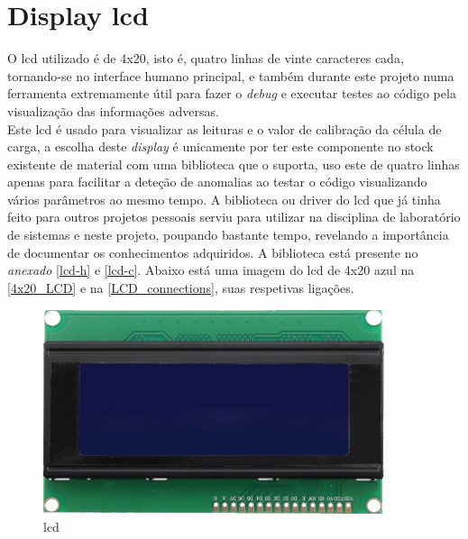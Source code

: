 \section{Display \acs{lcd}}
O \ac{lcd} utilizado é de 4x20, isto é, quatro linhas de vinte caracteres cada, tornando-se no interface humano principal, e também durante este projeto numa ferramenta extremamente útil para fazer o \textit{debug} e executar testes ao código pela visualização das informações adversas.\\
Este \acs{lcd} é usado para visualizar as leituras e o valor de calibração da célula de carga, a escolha deste \textit{display} é unicamente por ter este componente no stock existente de material com uma biblioteca que o suporta, uso este de quatro linhas apenas para facilitar a deteção de anomalias ao testar o código visualizando vários parâmetros ao mesmo tempo.
\emptyline
A biblioteca ou driver do \acs{lcd} que já tinha feito para outros projetos pessoais serviu para utilizar na disciplina de laboratório de sistemas \cite{article-1} e neste projeto, poupando bastante tempo, revelando a importância de documentar os conhecimentos adquiridos. A biblioteca está presente no \textit{anexado} \ref{lcd-h} e \ref{lcd-c}.
\emptyline
Abaixo está uma imagem do \acs{lcd} de 4x20 azul na \autoref{4x20_LCD} e na \autoref{LCD_connections}, suas respetivas ligações.\\
\begin{figure}[H]
	\centering
	\includegraphics[height=6cm]{./image/PESTA/material/4x20_LCD.jpg}
	\caption{\acs{lcd}}
	\label{4x20_LCD}
\end{figure}
